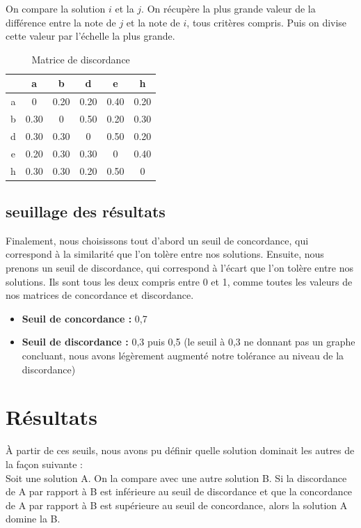\documentclass[paper=a4, fontsize=11pt]{report}
\numberwithin{equation}{section}		%
\numberwithin{figure}{section}			%
\numberwithin{table}{section}				%
\renewcommand{\bf}[1]{\textbf{#1}}
\begin{document}
On compare la solution $i$ et la $j$. On récupère la plus grande valeur de la différence entre la note de $j$ et la note de $i$, tous critères compris. Puis on divise cette valeur par l’échelle la plus grande.\\


\begin{table}[H]
\begin{center}
\begin{tabular}{c|ccccc}
 & a & b & d & e & h \\ 
\hline 
a & 0 & 0.20	 & 0.20 & 0.40 & 0.20 \\ 
b & 0.30 & 0	& 0.50 & 0.20 &	0.30 \\ 
d & 0.30 & 0.30 & 0 & 0.50 &	0.20 \\ 
e & 0.20 & 0.30 & 0.30 & 0 & 0.40 \\ 
h & 0.30 & 0.30 & 0.20 &	0.50 & 0\\ 
\end{tabular} 
\caption{Matrice de discordance} 
\end{center}
\end{table}

\subsection{seuillage des résultats}

Finalement, nous choisissons tout d’abord un seuil de concordance, qui correspond à la similarité que l’on tolère entre nos solutions. Ensuite, nous prenons un seuil de discordance, qui correspond à l’écart que l’on tolère entre nos solutions. Ils sont tous les deux compris entre 0 et 1, comme toutes les valeurs de nos matrices de concordance et discordance.\\

\begin{itemize}
\item \bf{Seuil de concordance :} 0,7
\item \bf{Seuil de discordance :} 0,3 puis 0,5 (le seuil à 0,3 ne donnant pas un graphe concluant, nous avons légèrement augmenté notre tolérance au niveau de la discordance)
\end{itemize}

\section{Résultats}

À partir de ces seuils, nous avons pu définir quelle solution dominait les autres de la façon suivante : \\
Soit une solution A. On la compare avec une autre solution B. Si la discordance de A par rapport à B est inférieure au seuil de discordance et que la concordance de A par rapport à B est supérieure au seuil de concordance, alors la solution A domine la B.\\
\end{document}
